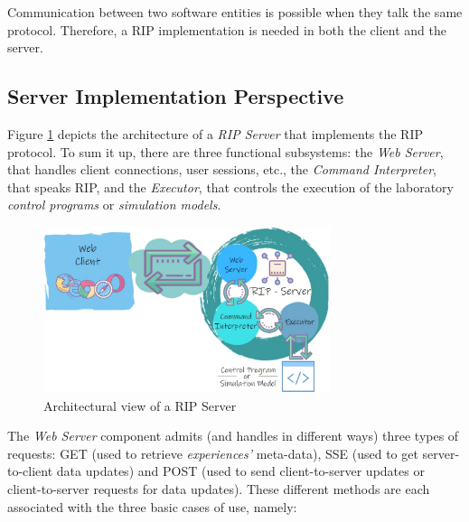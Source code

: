 Communication between two software entities is possible when they talk the same protocol. Therefore, a RIP implementation is needed in both the client and the server.

\subsection{Server Implementation Perspective}
Figure \ref{fig:RIP_Architecture} depicts the architecture of a \emph{RIP Server} that implements the RIP protocol. To sum it up, there are three functional subsystems: the \emph{Web Server}, that handles client connections, user sessions, etc., the \emph{Command Interpreter}, that speaks RIP, and the \emph{Executor}, that controls the execution of the laboratory \textit{control programs} or \textit{simulation models}.

\begin{figure}
\centering
\includegraphics[width=0.75\textwidth]{images/RIPArchitecture.pdf}
\caption{Architectural view of a RIP Server}
\label{fig:RIP_Architecture}
\end{figure}

The \textit{Web Server} component admits (and handles in different ways) three types of requests: GET (used to retrieve \textit{experiences'} meta-data), SSE (used to get server-to-client data updates) and POST (used to send client-to-server updates or client-to-server requests for data updates). These different methods are each associated with the three basic cases of use, namely:

